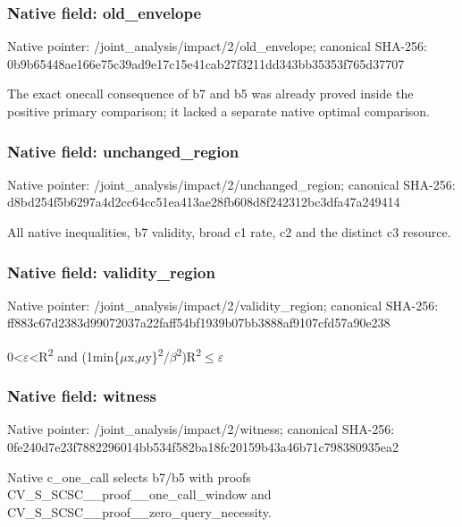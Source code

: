 \documentclass[10pt,a4paper]{article}
\begin{document}
\subsubsection{Native field: old\_envelope}


Native pointer: /joint\_analysis/impact/2/old\_envelope; canonical SHA-256: 0b9b65448ae166e75c39ad9e\allowbreak{}17c15e41cab27f3211dd343b\allowbreak{}b35353f765d37707


The exact onecall consequence of b7 and b5 was already proved inside the positive primary comparison; it lacked a separate native optimal comparison.


\subsubsection{Native field: unchanged\_region}


Native pointer: /joint\_analysis/impact/2\allowbreak{}/unchanged\_region; canonical SHA-256: d8bd254f5b6297a4d2cc64cc\allowbreak{}51ea413ae28fb608d8f24231\allowbreak{}2bc3dfa47a249414


All native inequalities, b7 validity, broad c1 rate, c2 and the distinct c3 resource.


\subsubsection{Native field: validity\_region}


Native pointer: /joint\_analysis/impact/2\allowbreak{}/validity\_region; canonical SHA-256: ff883c67d2383d99072037a2\allowbreak{}2faff54bf1939b07bb3888af\allowbreak{}9107cfd57a90e238


0<\ensuremath{\varepsilon}<R\textsuperscript{2} and (1min\{\ensuremath{\mu}x,\ensuremath{\mu}y\}\textsuperscript{2}/\ensuremath{\beta}\textsuperscript{2})R\textsuperscript{2}\ensuremath{\le}\ensuremath{\varepsilon}


\subsubsection{Native field: witness}


Native pointer: /joint\_analysis/impact/2/witness; canonical SHA-256: 0fe240d7e23f7882296014bb\allowbreak{}534f582ba18fc20159b43a46\allowbreak{}b71c798380935ea2


Native c\_one\_call selects b7/b5 with proofs CV\_S\_SCSC\_\_proof\_\_one\_call\_window and CV\_S\_SCSC\_\_proof\_\_zero\_query\_necessity.
\end{document}
